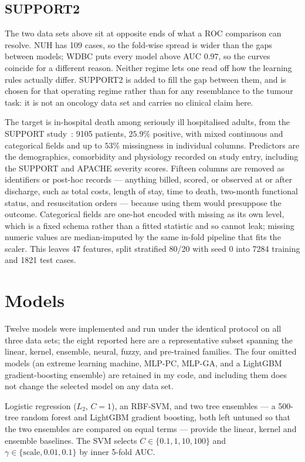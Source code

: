 \documentclass[11pt,a4paper]{article}
\begin{document}
\subsection{SUPPORT2}
\label{sec:support2-data}
The two data sets above sit at opposite ends of what a ROC comparison can resolve. NUH has 109 cases, so the fold-wise spread is wider than the gaps between models; WDBC puts every model above AUC $0.97$, so the curves coincide for a different reason. Neither regime lets one read off how the learning rules actually differ. SUPPORT2 is added to fill the gap between them, and is chosen for that operating regime rather than for any resemblance to the tumour task: it is not an oncology data set and carries no clinical claim here.

The target is in-hospital death among seriously ill hospitalised adults, from the SUPPORT study~\cite{knaus1995,support2uci}: 9105 patients, $25.9\%$ positive, with mixed continuous and categorical fields and up to $53\%$ missingness in individual columns. Predictors are the demographics, comorbidity and physiology recorded on study entry, including the SUPPORT and APACHE severity scores. Fifteen columns are removed as identifiers or post-hoc records --- anything billed, scored, or observed at or after discharge, such as total costs, length of stay, time to death, two-month functional status, and resuscitation orders --- because using them would presuppose the outcome. Categorical fields are one-hot encoded with missing as its own level, which is a fixed schema rather than a fitted statistic and so cannot leak; missing numeric values are median-imputed by the same in-fold pipeline that fits the scaler. This leaves 47 features, split stratified 80/20 with seed 0 into 7284 training and 1821 test cases.

\section{Models}
Twelve models were implemented and run under the identical protocol on all three data sets; the eight reported here are a representative subset spanning the linear, kernel, ensemble, neural, fuzzy, and pre-trained families. The four omitted models (an extreme learning machine, MLP-PC, MLP-GA, and a LightGBM gradient-boosting ensemble) are retained in my code, and including them does not change the selected model on any data set.

Logistic regression ($L_2$, $C=1$), an RBF-SVM, and two tree ensembles --- a 500-tree random forest and LightGBM gradient boosting, both left untuned so that the two ensembles are compared on equal terms --- provide the linear, kernel and ensemble baselines. The SVM selects $C\in\{0.1,1,10,100\}$ and $\gamma\in\{\text{scale},0.01,0.1\}$ by inner 5-fold AUC.
\end{document}
